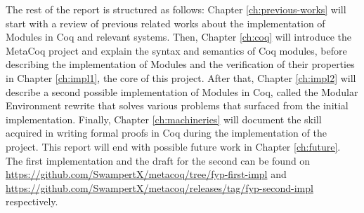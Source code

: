 The rest of the report is structured as follows: Chapter \ref{ch:previous-works}
will start with a review of previous related works about the implementation of
Modules in Coq and relevant systems. Then, Chapter \ref{ch:coq} will introduce
the MetaCoq project and explain the syntax and semantics of Coq modules, before
describing the implementation of Modules and the verification of their
properties in Chapter \ref{ch:impl1}, the core of this project. After that,
Chapter \ref{ch:impl2} will describe a second possible implementation of Modules
in Coq, called the Modular Environment rewrite that solves various problems that
surfaced from the initial implementation. Finally, Chapter \ref{ch:machineries}
will document the skill acquired in writing formal proofs in Coq during the
implementation of the project. This report will end with possible future work in
Chapter \ref{ch:future}. The first implementation and the draft for the second
can be found on \url{https://github.com/SwampertX/metacoq/tree/fyp-first-impl}
and \url{https://github.com/SwampertX/metacoq/releases/tag/fyp-second-impl}
respectively.
